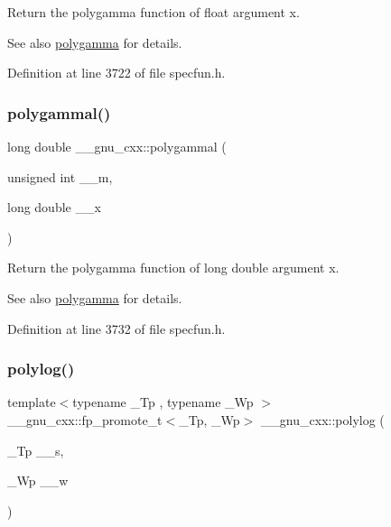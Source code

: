 Return the polygamma function of {\ttfamily float} argument {\ttfamily x}.

\begin{DoxySeeAlso}{See also}
\hyperlink{group__mathsf__gnu_ga65e674e7fe1457e819897e0d608c18b8}{polygamma} for details. 
\end{DoxySeeAlso}


Definition at line 3722 of file specfun.\+h.

\mbox{\label{group__mathsf__gnu_gaa6a37359a97ba43f32aa842705c416d4}} 
\subsubsection{\texorpdfstring{polygammal()}{polygammal()}}
{\footnotesize\ttfamily long double \+\_\+\+\_\+gnu\+\_\+cxx\+::polygammal (\begin{DoxyParamCaption}\item[{unsigned int}]{\+\_\+\+\_\+m,  }\item[{long double}]{\+\_\+\+\_\+x }\end{DoxyParamCaption})\hspace{0.3cm}{\ttfamily [inline]}}

Return the polygamma function of {\ttfamily long double} argument {\ttfamily x}.

\begin{DoxySeeAlso}{See also}
\hyperlink{group__mathsf__gnu_ga65e674e7fe1457e819897e0d608c18b8}{polygamma} for details. 
\end{DoxySeeAlso}


Definition at line 3732 of file specfun.\+h.

\mbox{\label{group__mathsf__gnu_gabcc5480ad739561c2debd6a8a352084f}} 
\subsubsection{\texorpdfstring{polylog()}{polylog()}\hspace{0.1cm}{\footnotesize\ttfamily [1/2]}}
{\footnotesize\ttfamily template$<$typename \+\_\+\+Tp , typename \+\_\+\+Wp $>$ \\
\+\_\+\+\_\+gnu\+\_\+cxx\+::fp\+\_\+promote\+\_\+t$<$\+\_\+\+Tp, \+\_\+\+Wp$>$ \+\_\+\+\_\+gnu\+\_\+cxx\+::polylog (\begin{DoxyParamCaption}\item[{\+\_\+\+Tp}]{\+\_\+\+\_\+s,  }\item[{\+\_\+\+Wp}]{\+\_\+\+\_\+w }\end{DoxyParamCaption})\hspace{0.3cm}{\ttfamily [inline]}}

